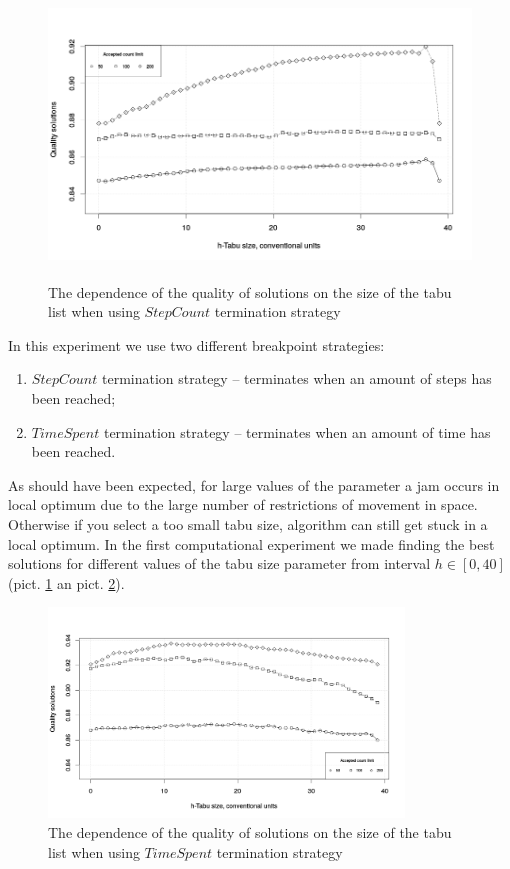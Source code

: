 \documentclass[]{TAACpaper}
\begin{document}
\begin{figure}[h]
	\hfil\includegraphics[height=3.0in]{images/tabuSize_stepCount}\hfil
	\caption
	{
	  The dependence of the quality of solutions on the size of the tabu list when using $ StepCount $ termination strategy
	}
	\label{aba:fig2}
\end{figure}

In this experiment we use two different breakpoint strategies: 
\begin{enumerate}
	\item $StepCount$ termination strategy --  terminates when an amount of steps has been reached;
	\item $TimeSpent$ termination strategy -- terminates when an amount of time has been reached.
\end{enumerate}

As should have been expected, for large values of the parameter a jam occurs in local optimum due to the large number of restrictions of movement in space. Otherwise if you select a too small tabu size, algorithm can still get stuck in a local optimum. In the first computational experiment we made finding the best solutions for different values of the tabu size parameter from interval $h \in [0, 40]$ (pict. \ref{aba:fig2} an pict. \ref{aba:fig3}).
\begin{figure}[h]
	\hfil\includegraphics[height=2.2in]{images/tabuSize_time}\hfil
	\caption
	{
	  The dependence of the quality of solutions on the size of the tabu list when using $ TimeSpent $ termination strategy
	}
	\label{aba:fig3}
\end{figure}
\end{document}
